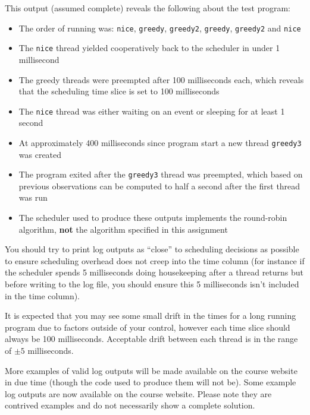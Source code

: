 \documentclass[12pt,a4paper]{article}
\begin{document}
This output (assumed complete) reveals the following about the test program:

\begin{itemize}
    \item The order of running was: \texttt{nice}, \texttt{greedy},
    \texttt{greedy2}, \texttt{greedy}, \texttt{greedy2} and \texttt{nice}

    \item The \texttt{nice} thread yielded cooperatively back to the scheduler
    in under 1 millisecond

    \item The greedy threads were preempted after 100 milliseconds each, which
    reveals that the scheduling time slice is set to 100 milliseconds

    \item The \texttt{nice} thread was either waiting on an event or sleeping
    for at least 1 second

    \item At approximately 400 milliseconds since program start a new thread
    \texttt{greedy3} was created

    \item The program exited after the \texttt{greedy3} thread was preempted,
    which based on previous observations can be computed to half a second after
    the first thread was run

    \item {\color{red}The scheduler used to produce these outputs implements the round-robin algorithm,
    \textbf{not} the algorithm specified in this assignment}
\end{itemize}

You should try to print log outputs as ``close'' to scheduling decisions as
possible to ensure scheduling overhead does not creep into the time column (for
instance if the scheduler spends 5 milliseconds doing housekeeping after a
thread returns but before writing to the log file, you should ensure this 5
milliseconds isn't included in the time column).

It is expected that you may see some small drift in the times for a long
running program due to factors outside of your control, however each time slice
should always be 100 milliseconds. Acceptable drift between each thread is in
the range of $\pm 5$ milliseconds.

More examples of valid log outputs will be made available on the course website
in due time (though the code used to produce them will not be). {\color{red}Some
example log outputs are now available on the course website. Please note they
are contrived examples and do not necessarily show a complete solution.}
\end{document}
